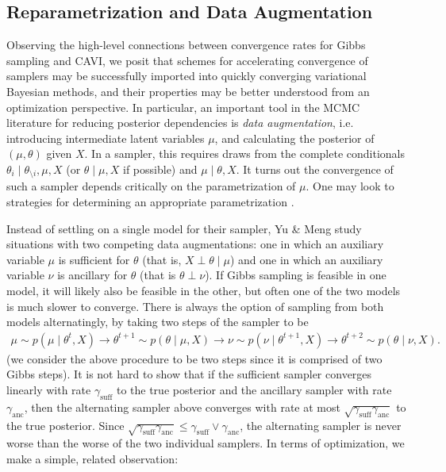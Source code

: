 \documentclass{article}
\begin{document}
\newpage

\subsection{Reparametrization and Data Augmentation} 

Observing the high-level connections between convergence rates for Gibbs sampling and CAVI, we posit that schemes for accelerating convergence of samplers may be successfully imported into quickly converging variational Bayesian methods, and their properties may be better understood from an optimization perspective. In particular, an important tool in the MCMC literature for reducing posterior dependencies is {\sl data augmentation}, i.e. introducing intermediate latent variables $\mu$, and calculating the posterior of $(\mu,\theta)$ given $X$. In a sampler, this requires draws from the complete conditionals $\theta_i \mid \theta_{\setminus i},\mu,X$ (or $\theta\mid \mu,X$ if possible) and $\mu \mid \theta,X$. It turns out the convergence of such a sampler depends critically on the parametrization of $\mu$. One may look to strategies for determining an appropriate parametrization \cite{Papaspiliopoulos}. 


Instead of settling on a single model for their sampler, Yu \& Meng \cite{Yu} study situations with two competing data augmentations: one in which an auxiliary variable $\mu$ is sufficient for $\theta$ (that is, $X\perp\theta\mid \mu$) and one in which an auxiliary variable $\nu$ is ancillary for $\theta$ (that is $\theta\perp \nu$). If Gibbs sampling is feasible in one model, it will likely also be feasible in the other, but often one of the two models is much slower to converge. There is always the option of sampling from both models alternatingly, by taking two steps of the sampler to be
\begin{align}
\mu\sim p(\mu \mid \theta^t,X) \to \theta^{t+1}\sim p(\theta \mid \mu,X) \to \nu\sim p(\nu\mid \theta^{t+1},X) \to \theta^{t+2}\sim p(\theta\mid \nu, X).
\end{align}
(we consider the above procedure to be two steps since it is comprised of two Gibbs steps). It is not hard to show that if the sufficient sampler converges linearly with rate $\gamma_{\text{suff}}$ to the true posterior and the ancillary sampler with rate $\gamma_{\text{anc}}$, then the alternating sampler above converges with rate at most $\sqrt{\gamma_{\text{suff}}\gamma_{\text{anc}}}$ to the true posterior. Since $\sqrt{\gamma_{\text{suff}}\gamma_{\text{anc}}} \le \gamma_{\text{suff}}\lor\gamma_{\text{anc}}$, the alternating sampler is never worse than the worse of the two individual samplers. In terms of optimization, we make a simple, related observation: 
\end{document}
